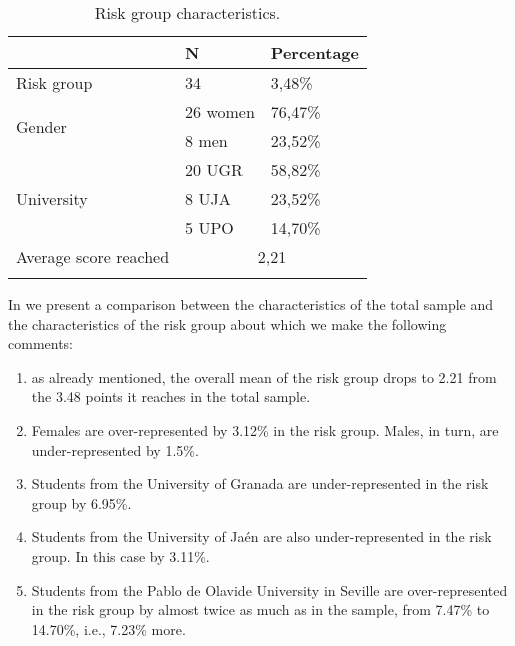 \documentclass[english]{textolivre}
\begin{document}
\begin{table}[h!]
\centering
\begin{threeparttable}
\caption{Risk group characteristics.}
\label{tab03}
\begin{tabular}{l l l}
\toprule
 & N & Percentage \\
\midrule
\arrayrulecolor[gray]{.7}
Risk group & 34 & 3,48\% \\
\midrule
\multirow{2}{*}{Gender} & 26 women & 76,47\%  \\
& 8 men & 23,52\% \\
\midrule
\multirow{3}{*}{University} & 20 UGR & 58,82\% \\
& 8 UJA & 23,52\% \\
& 5 UPO & 14,70\% \\
\midrule
Average score reached & \multicolumn{2}{c}{2,21} \\
\arrayrulecolor{black}
\bottomrule
\end{tabular}
\end{threeparttable}
\end{table}

In  we present a comparison between the characteristics of the total sample and the characteristics of the risk group about which we make the following comments:

\begin{enumerate}
    \item as already mentioned, the overall mean of the risk group drops to 2.21 from the 3.48 points it reaches in the total sample.
    \item Females are over-represented by 3.12\% in the risk group. Males, in turn, are under-represented by 1.5\%.
    \item Students from the University of Granada are under-represented in the risk group by 6.95\%.
    \item Students from the University of Jaén are also under-represented in the risk group. In this case by 3.11\%.
    \item Students from the Pablo de Olavide University in Seville are over-represented in the risk group by almost twice as much as in the sample, from 7.47\% to 14.70\%, i.e., 7.23\% more.
\end{enumerate}
\end{document}
